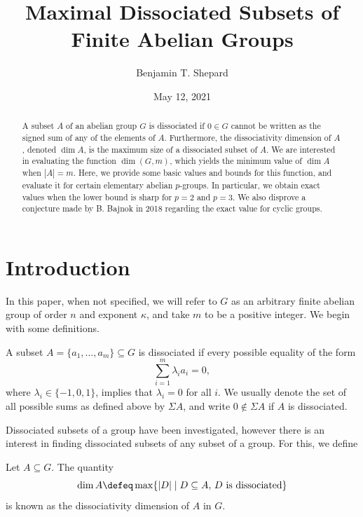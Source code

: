 \documentclass[ml]{sdoc}
\title{Maximal Dissociated Subsets of Finite Abelian Groups}
\author{Benjamin T. Shepard}
\date{May 12, 2021}
\begin{document}
\maketitle

\begin{abstract}
    A subset $A$ of an abelian group $G$ is dissociated if $0\in G$ cannot be written as the signed sum of any of the elements of $A$. Furthermore, the dissociativity dimension of $A$, denoted $\dim A$, is the maximum size of a dissociated subset of $A$. We are interested in evaluating the function $\dim(G, m)$, which yields the minimum value of $\dim A$ when $|A|=m$. Here, we provide some basic values and bounds for this function, and evaluate it for certain elementary abelian $p$-groups. In particular, we obtain exact values when the lower bound is sharp for $p=2$ and $p=3$. We also disprove a conjecture made by B. Bajnok in 2018 regarding the exact value for cyclic groups.
\end{abstract}

\tableofcontents

\section{Introduction}

In this paper, when not specified, we will refer to $G$ as an arbitrary finite abelian group of order $n$ and exponent $\kappa$, and take $m$ to be a positive integer. We begin with some definitions.

\begin{definition}
    A subset $A=\{a_1,\ldots,a_m\}\subseteq G$ is dissociated if every possible equality of the form
    \[\sum_{i=1}^m \lambda_i a_i = 0,\]
    where $\lambda_i\in\{-1,0,1\}$, implies that $\lambda_i=0$ for all $i$. We usually denote the set of all possible sums as defined above by $\Sigma A$, and write $0\notin\Sigma A$ if $A$ is dissociated.
\end{definition}

Dissociated subsets of a group have been investigated, however there is an interest in finding dissociated subsets of any subset of a group. For this, we define

\begin{definition}
Let $A\subseteq G$. The quantity
    \[\dim A \defeq \max\{|D|\mid D \subseteq A,\, D\ \mathrm{is\ dissociated}\}\]
    is known as the dissociativity dimension of $A$ in $G$.
\end{definition}
\end{document}
